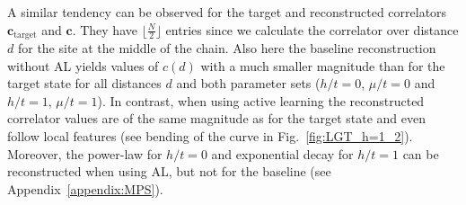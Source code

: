 \documentclass[pra,aps,showpacs,groupedaddress,superscriptaddress,twocolumn,toc=flat,biblatex,footinbib]{revtex4-1}
\renewcommand{\vec}[1]{\bm{#1}}
\begin{document}
A similar tendency can be observed for the target and reconstructed correlators $ \vec{c}_{\mathrm{target}}$ and $\vec{c}$. They have $\lfloor \frac{N}{2}\rfloor$ entries since we calculate the correlator over distance $d$ for the site at the middle of the chain. Also here the baseline reconstruction without AL yields values of $c(d)$ with a much smaller magnitude than for the target state for all distances $d$ and both parameter sets ($h/t=0$, $\mu/t=0$ and $h/t=1$, $\mu/t=1$). In contrast, when using active learning the reconstructed correlator values are of the same magnitude as for the target state and even follow local features (see bending of the curve in Fig.~\ref{fig:LGT_h=1_2}). Moreover, the power-law for $h/t=0$ and exponential decay for $h/t=1$ can be reconstructed when using AL, but not for the baseline (see Appendix~\ref{appendix:MPS}).\\
\end{document}
